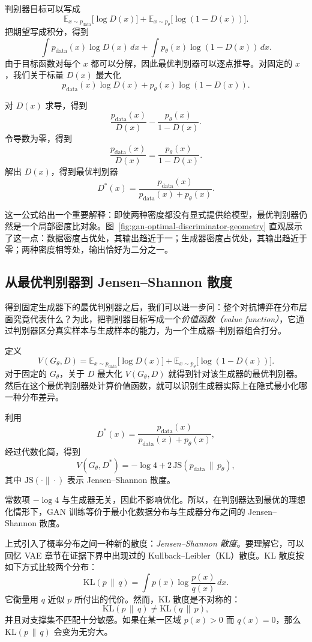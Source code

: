 判别器目标可以写成
\[
\mathbb{E}_{x \sim p_{\text{data}}}\!\big[\log D(x)\big]
+
\mathbb{E}_{x \sim p_\theta}\!\big[\log(1 - D(x))\big].
\]
把期望写成积分，得到
\[
\int
p_{\text{data}}(x)\log D(x)\,dx
+
\int
p_\theta(x)\log(1-D(x))\,dx.
\]
由于目标函数对每个 $x$ 都可以分解，因此最优判别器可以逐点推导。对固定的 $x$，我们关于标量 $D(x)$ 最大化
\[
p_{\text{data}}(x)\log D(x)
+
p_\theta(x)\log(1-D(x)).
\]

对 $D(x)$ 求导，得到
\[
\frac{p_{\text{data}}(x)}{D(x)}
-
\frac{p_\theta(x)}{1-D(x)}.
\]
令导数为零，得到
\[
\frac{p_{\text{data}}(x)}{D(x)}
=
\frac{p_\theta(x)}{1-D(x)}.
\]
解出 $D(x)$，得到最优判别器
\[
\boxed{
D^*(x)
=
\frac{p_{\text{data}}(x)}
{p_{\text{data}}(x)+p_\theta(x)}.
}
\]

这一公式给出一个重要解释：即使两种密度都没有显式提供给模型，最优判别器仍然是一个局部密度比对象。图~\ref{fig:gan-optimal-discriminator-geometry} 直观展示了这一点：数据密度占优处，其输出趋近于一；生成器密度占优处，其输出趋近于零；两种密度相等处，输出恰好为二分之一。



\subsection{从最优判别器到 Jensen--Shannon 散度}

得到固定生成器下的最优判别器之后，我们可以进一步问：整个对抗博弈在分布层面究竟代表什么？为此，把判别器目标写成一个\emph{价值函数（value function）}，它通过判别器区分真实样本与生成样本的能力，为一个生成器--判别器组合打分。

定义
\[
V(G_\theta,D)
=
\mathbb{E}_{x \sim p_{\text{data}}}\!\big[\log D(x)\big]
+
\mathbb{E}_{x \sim p_\theta}\!\big[\log(1-D(x))\big].
\]
对于固定的 $G_\theta$，关于 $D$ 最大化 $V(G_\theta,D)$ 就得到针对该生成器的最优判别器。然后在这个最优判别器处计算价值函数，就可以识别生成器实际上在隐式最小化哪一种分布差异。

利用
\[
D^*(x)
=
\frac{p_{\text{data}}(x)}
{p_{\text{data}}(x)+p_\theta(x)},
\]
经过代数化简，得到
\[
V(G_\theta,D^*)
=
-\log 4
+
2\,\mathrm{JS}\!\left(p_{\text{data}}\,\|\,p_\theta\right),
\]
其中 $\mathrm{JS}(\cdot\|\cdot)$ 表示 Jensen--Shannon 散度。

常数项 $-\log 4$ 与生成器无关，因此不影响优化。所以，在判别器达到最优的理想化情形下，GAN 训练等价于最小化数据分布与生成器分布之间的 Jensen--Shannon 散度。

上式引入了概率分布之间一种新的散度：\emph{Jensen--Shannon 散度}。要理解它，可以回忆 VAE 章节在证据下界中出现过的 Kullback--Leibler（KL）散度。KL 散度按如下方式比较两个分布：
\[
\mathrm{KL}(p\,\|\,q)
=
\int p(x)\log\frac{p(x)}{q(x)}\,dx.
\]
它衡量用 $q$ 近似 $p$ 所付出的代价。然而，KL 散度是不对称的：
\[
\mathrm{KL}(p\,\|\,q)
\neq
\mathrm{KL}(q\,\|\,p),
\]
并且对支撑集不匹配十分敏感。如果在某一区域 $p(x)>0$ 而 $q(x)=0$，那么 $\mathrm{KL}(p\,\|\,q)$ 会变为无穷大。

